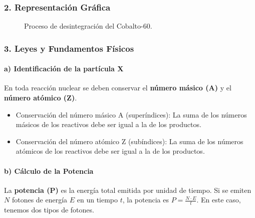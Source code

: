 \subsubsection*{2. Representación Gráfica}
\begin{figure}[H]
    \centering
    \caption{Proceso de desintegración del Cobalto-60.}
\end{figure}

\subsubsection*{3. Leyes y Fundamentos Físicos}
\paragraph*{a) Identificación de la partícula X}
En toda reacción nuclear se deben conservar el \textbf{número másico (A)} y el \textbf{número atómico (Z)}.
\begin{itemize}
    \item Conservación del número másico A (superíndices): La suma de los números másicos de los reactivos debe ser igual a la de los productos.
    \item Conservación del número atómico Z (subíndices): La suma de los números atómicos de los reactivos debe ser igual a la de los productos.
\end{itemize}

\paragraph*{b) Cálculo de la Potencia}
La \textbf{potencia (P)} es la energía total emitida por unidad de tiempo. Si se emiten $N$ fotones de energía $E$ en un tiempo $t$, la potencia es $P = \frac{N \cdot E}{t}$. En este caso, tenemos dos tipos de fotones.

